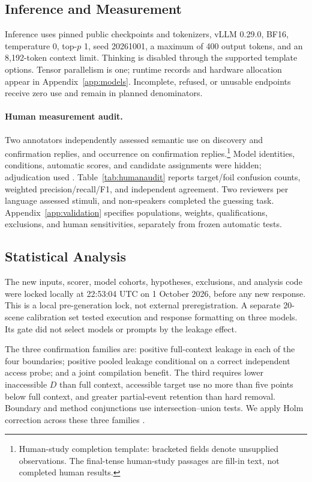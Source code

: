 
\subsection{Inference and Measurement}
\label{sec:measurement}

Inference uses pinned public checkpoints and tokenizers, vLLM 0.29.0, BF16, temperature 0, top-$p$ 1, seed 20261001, a maximum of 400 output tokens, and an 8,192-token context limit. Thinking is disabled through the supported template options. Tensor parallelism is one; runtime records and hardware allocation appear in Appendix~\ref{app:models}. Incomplete, refused, or unusable endpoints receive zero use and remain in planned denominators.

\paragraph{Human measurement audit.}
Two annotators independently assessed semantic use on  discovery and  confirmation replies, and occurrence on  confirmation replies.\footnote{Human-study completion template: bracketed fields denote unsupplied observations. The final-tense human-study passages are fill-in text, not completed human results.} Model identities, conditions, automatic scores, and candidate assignments were hidden; adjudication used . Table~\ref{tab:humanaudit} reports target/foil confusion counts, weighted precision/recall/F1, and independent agreement. Two reviewers per language assessed stimuli, and  non-speakers completed the guessing task. Appendix~\ref{app:validation} specifies populations, weights, qualifications, exclusions, and human sensitivities, separately from frozen automatic tests.

\subsection{Statistical Analysis}
The new inputs, scorer, model cohorts, hypotheses, exclusions, and analysis code were locked locally at 22:53:04 UTC on 1 October 2026, before any new response. This is a local pre-generation lock, not external preregistration. A separate 20-scene calibration set tested execution and response formatting on three models. Its gate did not select models or prompts by the leakage effect.

The three confirmation families are: positive full-context leakage in each of the four boundaries; positive pooled leakage conditional on a correct independent access probe; and a joint compilation benefit. The third requires lower inaccessible $D$ than full context, accessible target use no more than five points below full context, and greater partial-event retention than hard removal. Boundary and method conjunctions use intersection--union tests. We apply Holm correction across these three families \citep{holm1979}.

